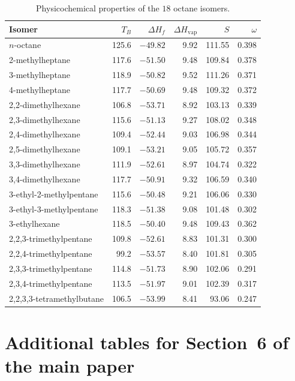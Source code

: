 \documentclass[a5paper, 10pt]{article}
\theoremstyle{plain}
\theoremstyle{remark}
\theoremstyle{definition}
\begin{document}
\begin{table}[H]
\centering\small
\caption{Physicochemical properties of the $18$ octane isomers.}
\label{tab:octane-data}
\begin{tabular}{lrrrrr}
\toprule
Isomer & $T_B$ & $\Delta H_f$ & $\Delta H_{\mathrm{vap}}$ & $S$ & $\omega$\\
\midrule
$n$-octane & 125.6 & $-49.82$ & 9.92 & 111.55 & 0.398\\
2-methylheptane & 117.6 & $-51.50$ & 9.48 & 109.84 & 0.378\\
3-methylheptane & 118.9 & $-50.82$ & 9.52 & 111.26 & 0.371\\
4-methylheptane & 117.7 & $-50.69$ & 9.48 & 109.32 & 0.372\\
2,2-dimethylhexane & 106.8 & $-53.71$ & 8.92 & 103.13 & 0.339\\
2,3-dimethylhexane & 115.6 & $-51.13$ & 9.27 & 108.02 & 0.348\\
2,4-dimethylhexane & 109.4 & $-52.44$ & 9.03 & 106.98 & 0.344\\
2,5-dimethylhexane & 109.1 & $-53.21$ & 9.05 & 105.72 & 0.357\\
3,3-dimethylhexane & 111.9 & $-52.61$ & 8.97 & 104.74 & 0.322\\
3,4-dimethylhexane & 117.7 & $-50.91$ & 9.32 & 106.59 & 0.340\\
3-ethyl-2-methylpentane & 115.6 & $-50.48$ & 9.21 & 106.06 & 0.330\\
3-ethyl-3-methylpentane & 118.3 & $-51.38$ & 9.08 & 101.48 & 0.302\\
3-ethylhexane & 118.5 & $-50.40$ & 9.48 & 109.43 & 0.362\\
2,2,3-trimethylpentane & 109.8 & $-52.61$ & 8.83 & 101.31 & 0.300\\
2,2,4-trimethylpentane & 99.2 & $-53.57$ & 8.40 & 101.81 & 0.305\\
2,3,3-trimethylpentane & 114.8 & $-51.73$ & 8.90 & 102.06 & 0.291\\
2,3,4-trimethylpentane & 113.5 & $-51.97$ & 9.01 & 102.39 & 0.317\\
2,2,3,3-tetramethylbutane & 106.5 & $-53.99$ & 8.41 & 93.06 & 0.247\\
\bottomrule
\end{tabular}
\end{table}

\section{Additional tables for Section~6 of the main paper}\label{sec:s-tables}
\end{document}
